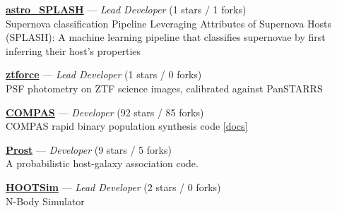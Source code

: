 \item \href{https://github.com/Adam-Boesky/astro_SPLASH}{{\bf astro{\_}SPLASH}} --- \textit{Lead Developer} (1 stars / 1 forks) \\
Supernova classification Pipeline Leveraging Attributes of Supernova Hosts (SPLASH): A machine learning pipeline that classifies supernovae by first inferring their host's properties 

\item \href{https://github.com/Adam-Boesky/ztforce}{{\bf ztforce}} --- \textit{Lead Developer} (1 stars / 0 forks) \\
PSF photometry on ZTF science images, calibrated against PanSTARRS 

\item \href{https://github.com/TeamCOMPAS/COMPAS}{{\bf COMPAS}} --- \textit{Developer} (92 stars / 85 forks) \\
COMPAS rapid binary population synthesis code \href{http://compas.science}{[docs]}

\item \href{https://github.com/alexandergagliano/Prost}{{\bf Prost}} --- \textit{Developer} (9 stars / 5 forks) \\
A probabilistic host-galaxy association code.  

\item \href{https://github.com/jdinovi/HOOTSim}{{\bf HOOTSim}} --- \textit{Lead Developer} (2 stars / 0 forks) \\
N-Body Simulator 